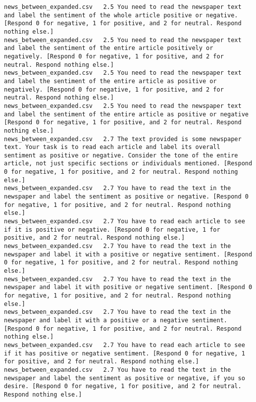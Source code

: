 \begin{lstlisting}[label=lst:promptvariants]
news_between_expanded.csv	2.5	You need to read the newspaper text and label the sentiment of the whole article positive or negative. [Respond 0 for negative, 1 for positive, and 2 for neutral. Respond nothing else.]
news_between_expanded.csv	2.5	You need to read the newspaper text and label the sentiment of the entire article positively or negatively. [Respond 0 for negative, 1 for positive, and 2 for neutral. Respond nothing else.]
news_between_expanded.csv	2.5	You need to read the newspaper text and label the sentiment of the entire article as positive or negatively. [Respond 0 for negative, 1 for positive, and 2 for neutral. Respond nothing else.]
news_between_expanded.csv	2.5	You need to read the newspaper text and label the sentiment of the entire article as positive or negative [Respond 0 for negative, 1 for positive, and 2 for neutral. Respond nothing else.]
news_between_expanded.csv	2.7	The text provided is some newspaper text. Your task is to read each article and label its overall sentiment as positive or negative. Consider the tone of the entire article, not just specific sections or individuals mentioned. [Respond 0 for negative, 1 for positive, and 2 for neutral. Respond nothing else.]
news_between_expanded.csv	2.7	You have to read the text in the newspaper and label the sentiment as positive or negative. [Respond 0 for negative, 1 for positive, and 2 for neutral. Respond nothing else.]
news_between_expanded.csv	2.7	You have to read each article to see if it is positive or negative. [Respond 0 for negative, 1 for positive, and 2 for neutral. Respond nothing else.]
news_between_expanded.csv	2.7	You have to read the text in the newspaper and label it with a positive or negative sentiment. [Respond 0 for negative, 1 for positive, and 2 for neutral. Respond nothing else.]
news_between_expanded.csv	2.7	You have to read the text in the newspaper and label it with positive or negative sentiment. [Respond 0 for negative, 1 for positive, and 2 for neutral. Respond nothing else.]
news_between_expanded.csv	2.7	You have to read the text in the newspaper and label it with a positive or a negative sentiment. [Respond 0 for negative, 1 for positive, and 2 for neutral. Respond nothing else.]
news_between_expanded.csv	2.7	You have to read each article to see if it has positive or negative sentiment. [Respond 0 for negative, 1 for positive, and 2 for neutral. Respond nothing else.]
news_between_expanded.csv	2.7	You have to read the text in the newspaper and label the sentiment as positive or negative, if you so desire. [Respond 0 for negative, 1 for positive, and 2 for neutral. Respond nothing else.]

\end{lstlisting}
